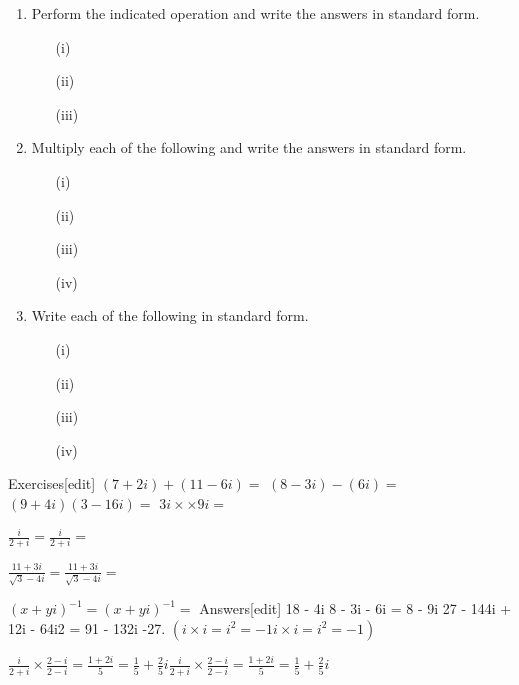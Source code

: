 \documentclass[12pt, a4paper]{report}
\theoremstyle{plain}
\theoremstyle{definition}
\theoremstyle{remark}
\begin{document}

\begin{enumerate}

\item  Perform the indicated operation and write the answers in standard form.
\begin{itemize}
\item[(i)] 
\item[(ii)] 
\item[(iii)] 
\end{itemize}


\item   Multiply each of the following and write the answers in standard form.
\begin{itemize}
\item[(i)]    
\item[(ii)]    
\item[(iii)]    
\item[(iv)] 
\end{itemize}
   
\item  Write each of the following in standard form.
\begin{itemize}
\item[(i)]    
\item[(ii)]    
\item[(iii)]    
\item[(iv)]    
\end{itemize}

\end{enumerate}


Exercises[edit]
$(7 + 2i) + (11 - 6i) =$
$(8 - 3i) - (6i) =$
$(9 + 4i)(3 - 16i) =$
$3i {\displaystyle \times } \times  9i =$

${\displaystyle {\frac {i}{2+i}}=} {\displaystyle {\frac {i}{2+i}}=}$

${\displaystyle {\frac {11+3i}{{\sqrt {3}}-4i}}=} {\displaystyle {\frac {11+3i}{{\sqrt {3}}-4i}}=}$

${\displaystyle {(x+yi)}^{-1}=} {\displaystyle {(x+yi)}^{-1}=}$
Answers[edit]
18 - 4i
8 - 3i - 6i = 8 - 9i
27 - 144i + 12i - 64i2 = 91 - 132i
-27. $( {\displaystyle i\times i=i^{2}=-1} {\displaystyle i\times i=i^{2}=-1})$

${\displaystyle {\frac {i}{2+i}}\times {\frac {2-i}{2-i}}={\frac {1+2i}{5}}={\frac {1}{5}}+{\frac {2}{5}}i} {\displaystyle {\frac {i}{2+i}}\times {\frac {2-i}{2-i}}={\frac {1+2i}{5}}={\frac {1}{5}}+{\frac {2}{5}}i}$
\end{document}
